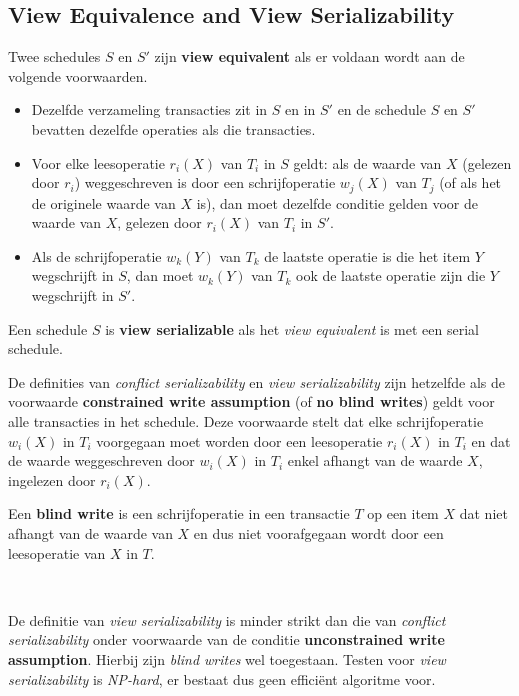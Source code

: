 \subsection{View Equivalence and View Serializability}
Twee schedules $S$ en $S'$ zijn \textbf{view equivalent} als er voldaan wordt aan de volgende voorwaarden.
\vspace{-2mm}
\begin{itemize}\addtolength{\itemsep}{-0.3\baselineskip}
	\item Dezelfde verzameling transacties zit in $S$ en in $S'$ en de schedule $S$ en $S'$ bevatten dezelfde operaties als die transacties.
	\item Voor elke leesoperatie $r_i(X)$ van $T_i$ in $S$ geldt: als de waarde van $X$ (gelezen door $r_i$) weggeschreven is door een schrijfoperatie $w_j(X)$ van $T_j$ (of als het de originele waarde van $X$ is), dan moet dezelfde conditie gelden voor de waarde van $X$, gelezen door $r_i(X)$ van $T_i$ in $S'$.
	\item Als de schrijfoperatie $w_k(Y)$ van $T_k$ de laatste operatie is die het item $Y$ wegschrijft in $S$, dan moet $w_k(Y)$ van $T_k$ ook de laatste operatie zijn die $Y$ wegschrijft in $S'$.
\end{itemize}
Een schedule $S$ is \textbf{view serializable} als het \textit{view equivalent} is met een serial schedule.

De definities van \textit{conflict serializability} en \textit{view serializability} zijn hetzelfde als de voorwaarde \textbf{constrained write assumption} (of \textbf{no blind writes}) geldt voor alle transacties in het schedule. Deze voorwaarde stelt dat elke schrijfoperatie $w_i(X)$ in $T_i$ voorgegaan moet worden door een leesoperatie $r_i(X)$ in $T_i$ en dat de waarde weggeschreven door $w_i(X)$ in $T_i$ enkel afhangt van de waarde $X$, ingelezen door $r_i(X)$.

Een \textbf{blind write} is een schrijfoperatie in een transactie $T$ op een item $X$ dat niet afhangt van de waarde van $X$ en dus niet voorafgegaan wordt door een leesoperatie van $X$ in $T$.

~

\noindent De definitie van \textit{view serializability} is minder strikt dan die van \textit{conflict serializability} onder voorwaarde van de conditie \textbf{unconstrained write assumption}. Hierbij zijn \textit{blind writes} wel toegestaan. Testen voor \textit{view serializability} is \textit{NP-hard}, er bestaat dus geen effici\"ent algoritme voor.


